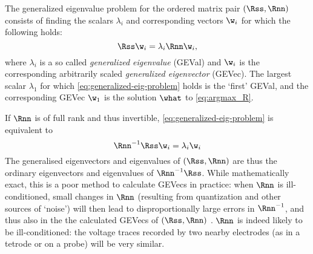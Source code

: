 The generalized eigenvalue problem for the ordered matrix pair $(\Rss, \Rnn)$ consists of finding the scalars $\lambda_i$ and corresponding vectors $\w_i$ for which the following holds:
%
\begin{equation}
\label{eq:generalized-eig-problem}
\Rss \w_i = \lambda_i \Rnn \w_i,
\end{equation}
%
where $\lambda_i$ is a so called \emph{generalized eigenvalue} (GEVal) and $\w_i$ is the corresponding arbitrarily scaled \emph{generalized eigenvector} (GEVec). The largest scalar $\lambda_1$ for which \cref{eq:generalized-eig-problem} holds is the `first' GEVal, and the corresponding GEVec $\w_1$ is the solution $\what$ to \cref{eq:argmax_R}.

If $\Rnn$ is of full rank and thus invertible, \cref{eq:generalized-eig-problem} is equivalent to
\[
\Rnn^{-1} \Rss \w_i = \lambda_i \w_i
\]
The generalised eigenvectors and eigenvalues of $(\Rss, \Rnn)$ are thus the ordinary eigenvectors and eigenvalues of $\Rnn^{-1} \Rss$. While mathematically exact, this is a poor method to calculate GEVecs in practice: when $\Rnn$ is ill-conditioned, small changes in $\Rnn$ (resulting from quantization and other sources of `noise') will then lead to disproportionally large errors in $\Rnn^{-1}$, and thus also in the the calculated GEVecs of $(\Rss, \Rnn)$ \cite{Trefethen1997,Golub2013}. $\Rnn$ is indeed likely to be ill-conditioned: the voltage traces recorded by two nearby electrodes (as in a tetrode or on a probe) will be very similar. 


